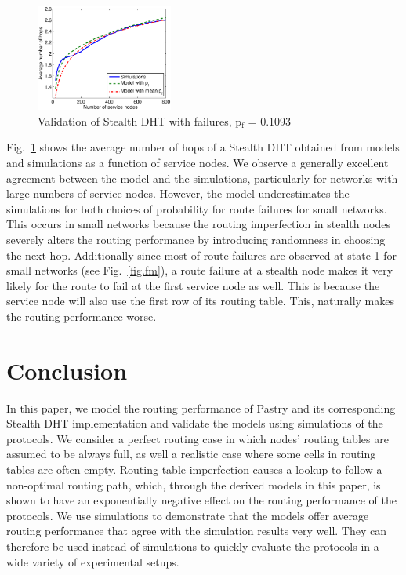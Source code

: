 \documentclass[10pt,twocolumn]{article}
\newcommand{\subscript}[1]{\ensuremath{_\textrm{#1}}}
\begin{document}
\begin{figure}[tb] \centering
     {\includegraphics[width=0.4\textwidth]{val_stealth1.eps}
     \caption{Validation of Stealth DHT with failures, p\subscript{f} = 0.1093}
     \label{fig.vstealth}}
\end{figure}

Fig.~\ref{fig.vstealth} shows the average number of hops of a Stealth DHT
obtained from models and simulations as a function of service nodes. We observe
a generally excellent agreement between the model and the simulations,
particularly for networks with large numbers of service nodes. However, the
model underestimates the simulations for both choices of probability for route
failures for small networks. This occurs in small networks because the routing
imperfection in stealth nodes severely alters the routing performance by
introducing randomness in choosing the next hop.
Additionally since most of route failures are observed at state 1 for small networks (see
Fig.~\ref{fig.fm}), a route failure at a stealth node makes it very likely for the route to fail at
the first service node as well. This is  because the service node will also use
the first row of its routing table. This, naturally makes the routing
performance worse.

\section{Conclusion}
\label{conc}

In this paper, we model the routing performance of  Pastry and its
corresponding Stealth DHT implementation and validate the models using
simulations of the protocols. We consider a perfect routing case in which
nodes' routing tables are assumed to be always full, as well a realistic case
where some cells in routing tables are often empty. Routing table imperfection
causes a lookup to follow a non-optimal routing path, which, through the
derived models in this paper, is shown to have an exponentially negative effect
on the routing performance of the protocols. We use simulations to demonstrate
that the models offer average routing performance that agree with the
simulation results very well. They can therefore be used instead of simulations
to quickly evaluate the protocols in a wide variety of experimental setups.
\end{document}
